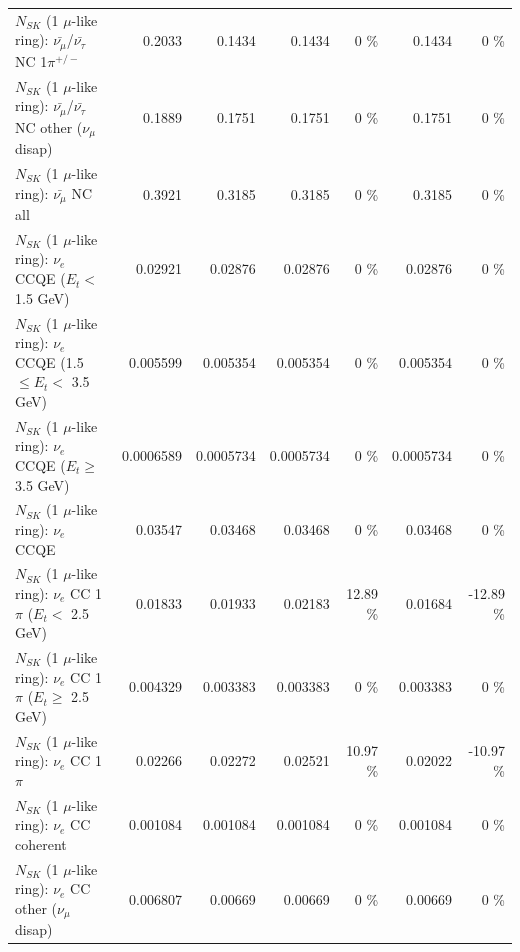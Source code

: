 \begin{table}
\begin{tabular}{| l | r | r | r  r | r  r |}
\hline
  $N_{SK}$ (1 $\mu$-like ring): $\bar{\nu_\mu}$/$\bar{\nu_\tau}$ NC 1$\pi^{+/-}$ &          0.2033 &          0.1434 &          0.1434 &        0 \%  &          0.1434 &        0 \%  \\ 
$N_{SK}$ (1 $\mu$-like ring): $\bar{\nu_\mu}$/$\bar{\nu_\tau}$ NC other ($\nu_\mu$ disap) &          0.1889 &          0.1751 &          0.1751 &        0 \%  &          0.1751 &        0 \%  \\ 
                          $N_{SK}$ (1 $\mu$-like ring): $\bar{\nu_{\mu}}$ NC all &          0.3921 &          0.3185 &          0.3185 &        0 \%  &          0.3185 &        0 \%  \\ 
\hline
\hline
\hline
                  $N_{SK}$ (1 $\mu$-like ring): $\nu_e$ CCQE ($E_{t} <$ 1.5 GeV) &         0.02921 &         0.02876 &         0.02876 &        0 \%  &         0.02876 &        0 \%  \\ 
         $N_{SK}$ (1 $\mu$-like ring): $\nu_e$ CCQE (1.5 $\leq E_{t} <$ 3.5 GeV) &        0.005599 &        0.005354 &        0.005354 &        0 \%  &        0.005354 &        0 \%  \\ 
               $N_{SK}$ (1 $\mu$-like ring): $\nu_e$ CCQE ($E_{t} \geq$ 3.5 GeV) &       0.0006589 &       0.0005734 &       0.0005734 &        0 \%  &       0.0005734 &        0 \%  \\ 
\hline
                                      $N_{SK}$ (1 $\mu$-like ring): $\nu_e$ CCQE &         0.03547 &         0.03468 &         0.03468 &        0 \%  &         0.03468 &        0 \%  \\ 
\hline
             $N_{SK}$ (1 $\mu$-like ring): $\nu_e$ CC 1$\pi$ ($E_{t} <$ 2.5 GeV) &         0.01833 &         0.01933 &         0.02183 &    12.89 \%  &         0.01684 &   -12.89 \%  \\ 
          $N_{SK}$ (1 $\mu$-like ring): $\nu_e$ CC 1$\pi$ ($E_{t} \geq$ 2.5 GeV) &        0.004329 &        0.003383 &        0.003383 &        0 \%  &        0.003383 &        0 \%  \\ 
\hline
                                 $N_{SK}$ (1 $\mu$-like ring): $\nu_e$ CC 1$\pi$ &         0.02266 &         0.02272 &         0.02521 &    10.97 \%  &         0.02022 &   -10.97 \%  \\ 
                               $N_{SK}$ (1 $\mu$-like ring): $\nu_e$ CC coherent &        0.001084 &        0.001084 &        0.001084 &        0 \%  &        0.001084 &        0 \%  \\ 
                $N_{SK}$ (1 $\mu$-like ring): $\nu_e$ CC other ($\nu_\mu$ disap) &        0.006807 &         0.00669 &         0.00669 &        0 \%  &         0.00669 &        0 \%  \\ 

\end{tabular}
\end{table}
